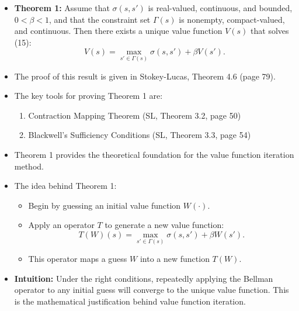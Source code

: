 \documentclass[12pt]{article}
\begin{document}
\begin{itemize}
\item \textbf{Theorem 1:} Assume that $\sigma(s, s')$ is real-valued, continuous, and bounded, $0 < \beta < 1$, and that the constraint set $\Gamma(s)$ is nonempty, compact-valued, and continuous. Then there exists a unique value function $V(s)$ that solves (15):
\[
V(s) = \max_{s' \in \Gamma(s)} \sigma(s, s') + \beta V(s').
\]

\item The proof of this result is given in Stokey-Lucas, Theorem 4.6 (page 79).

\item The key tools for proving Theorem 1 are:
\begin{enumerate}
    \item Contraction Mapping Theorem (SL, Theorem 3.2, page 50)
    \item Blackwell’s Sufficiency Conditions (SL, Theorem 3.3, page 54)
\end{enumerate}

\item Theorem 1 provides the theoretical foundation for the value function iteration method.

\item The idea behind Theorem 1:
\begin{itemize}
    \item Begin by guessing an initial value function $W(\cdot)$.
    \item Apply an operator $T$ to generate a new value function:
    \[
    T(W)(s) = \max_{s' \in \Gamma(s)} \sigma(s, s') + \beta W(s').
    \]
    \item This operator maps a guess $W$ into a new function $T(W)$.
\end{itemize}

\item \textbf{Intuition:} Under the right conditions, repeatedly applying the Bellman operator to any initial guess will converge to the unique value function. This is the mathematical justification behind value function iteration.

\end{itemize}
\end{document}

